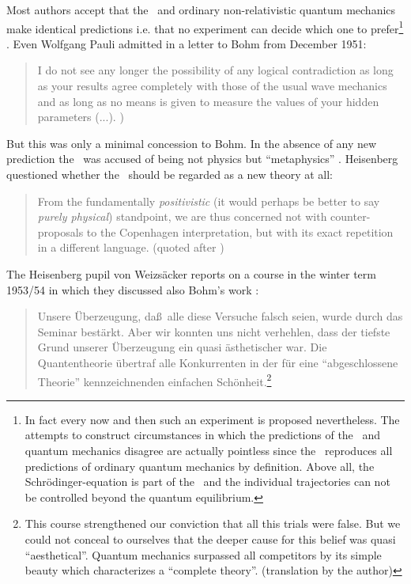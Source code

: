 Most authors accept that the \dbb\ and ordinary non-relativistic quantum mechanics make 
identical predictions i.e. that no experiment can decide which one to prefer\footnote{In fact every now and then such an 
experiment is proposed nevertheless. The attempts to construct circumstances in which the predictions of the \dbb\ and 
quantum mechanics disagree are actually pointless since the \dbb\ reproduces all predictions of ordinary quantum mechanics by definition.
Above all, the Schr\"odinger-equation is part of the \dbb\ and the individual trajectories can not be controlled 
beyond the quantum equilibrium.} . 
Even Wolfgang Pauli admitted in a letter to Bohm from December 1951:
\begin{quote}
I do not see any longer the possibility of any logical contradiction as long
as your results agree completely with those of the usual wave mechanics and as
long as no means is given to measure the values of your hidden parameters
(...). \cite[letter 1313]{briefwechsel})
\end{quote}
But this was only a minimal concession to Bohm. In the absence of any new prediction 
the \dbb\ was accused of being not physics but ``metaphysics'' \cite{pauli52}. Heisenberg 
questioned whether the \dbb\ should be regarded as a new theory at all:
\begin{quote}
From the fundamentally {\em positivistic} (it would perhaps be better to say 
{\em purely physical}) standpoint, we are thus concerned not with
counter-proposals to the Copenhagen interpretation, but with its exact
repetition in a different language.  
(quoted after \cite{early})  
\end{quote} 
The Heisenberg pupil von Weizs\"acker reports on a 
course in the winter term 1953/54 in which they discussed also Bohm's work 
\cite{aufbau}: 
\begin{quote}
Unsere \"Uberzeugung, da\ss\  alle diese Versuche falsch seien, wurde durch das
Seminar best\"arkt. Aber wir konnten uns nicht verhehlen, dass der tiefste Grund
unserer \"Uberzeugung ein quasi \"asthetischer war. Die Quantentheorie
\"ubertraf alle Konkurrenten in der f\"ur eine ``abgeschlossene Theorie''
kennzeichnenden einfachen Sch\"onheit.\footnote{This course strengthened our conviction 
that all this trials were false. But we could not conceal to ourselves that the deeper 
cause for this belief was quasi ``aesthetical''. Quantum mechanics surpassed
all competitors by its simple beauty which characterizes a ``complete theory''.
(translation by the author)}
\end{quote}

